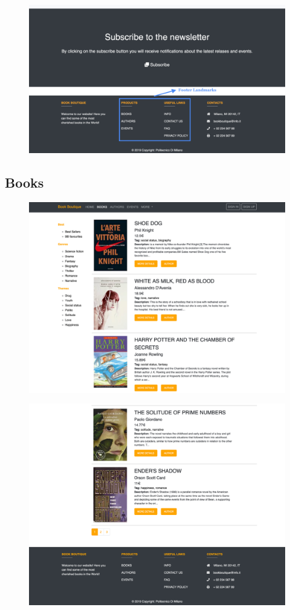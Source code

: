 \documentclass[12pt,a4paper]{article}
\begin{document}
\newpage
\begin{figure}[h]
	\centering
	\includegraphics[width=0.9\linewidth]{homescreen3}
	\label{fig:books}
\end{figure}
\newpage
\subsection{Books}
\begin{figure}[h]
	\centering
	\includegraphics[width=0.9\linewidth]{"Pages screenshots/books1"}
	\label{fig:books1}
\end{figure}
\newpage
\begin{figure}[h]
	\centering
	\includegraphics[width=0.9\linewidth]{"Pages screenshots/books2"}
	\label{fig:books}
\end{figure}
\newpage
\end{document}
